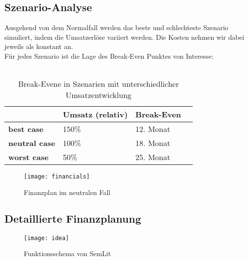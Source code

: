 \subsection{Szenario-Analyse}
Ausgehend von dem Normalfall werden das beste und schlechteste Szenario simuliert, indem die Umsatzerlöse variiert werden. Die Kosten nehmen wir dabei jeweils als konstant an.\\
Für jedes Szenario ist die Lage des Break-Even Punktes von Interesse:
\\
\\
\begin{table}[h!]
  \centering
    \begin{footnotesize}
  \begin{tabular}{|l|l|l|l|}\hline
  \textbf{ } &  \textbf{Umsatz (relativ)} &  \textbf{Break-Even} \\ \hline
 \textbf{best case} & 150\% & 12. Monat \\ \hline
\textbf{neutral case} & 100\% & 18. Monat \\ \hline
 \textbf{worst case} & 50\% & 25. Monat \\ \hline
  \end{tabular} 
    \end{footnotesize}
  \caption{Break-Evene in Szenarien mit unterschiedlicher Umsatzentwicklung}
  \label{tab:break-even}
\end{table} 

\begin{figure}[h!]
\centering
\texttt{[image: financials]}
\caption{Finanzplan im neutralen Fall}
\label{fig:financials1}
\end{figure}

\subsection{Detaillierte Finanzplanung}



\begin{figure}[h!]
\centering
\texttt{[image: idea]}
\caption{Funktionsschema von SemLit}
\label{fig:financials2}
\end{figure}
